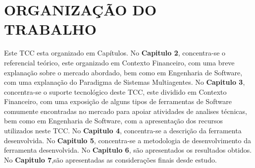 \section{ORGANIZAÇÃO DO TRABALHO}

Este TCC esta organizado em Capítulos. No \textbf{Capitulo 2}, concentra-se o referencial teórico, este organizado em Contexto Financeiro, com uma breve explanação sobre o mercado abordado, bem como em Engenharia de Software, com uma explanação do Paradigma de Sistemas Multiagentes. No \textbf{Capitulo 3}, concentra-se o suporte tecnológico deste TCC, este dividido em Contexto Financeiro, com uma exposição de alguns tipos de ferramentas de Software comumente encontradas no mercado para apoiar atividades de analises técnicas, bem como em Engenharia de Software, com a apresentação dos recursos utilizados neste TCC. No \textbf{Capitulo 4}, concentra-se a descrição da ferramenta desenvolvida. No \textbf{Capitulo 5}, concentra-se a metodologia de desenvolvimento da ferramenta desenvolvida. No \textbf{Capitulo 6}, são apresentados os resultados obtidos. No \textbf{Capitulo 7},são apresentadas as considerações finais desde estudo.